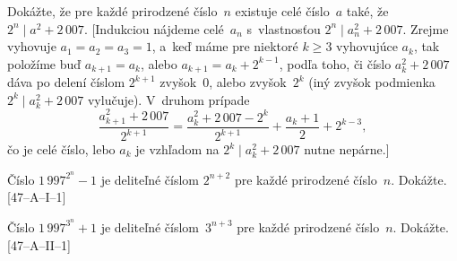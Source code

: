 {
Dokážte, že pre každé prirodzené číslo~$n$ existuje celé číslo~$a$
také, že $2^n\mid a^2+2\,007$. [Indukciou nájdeme celé~$a_n$
s~vlastnosťou $2^n\mid a_n^2+2\,007$.
Zrejme vyhovuje $a_1=a_2=a_3=1$,
a~keď máme pre niektoré $k\ge3$ vyhovujúce $a_k$,
tak položíme buď $a_{k+1}=a_{k}$, alebo $a_{k+1}=a_{k}+2^{k-1}$,
podľa toho, či číslo
$a_k^2+2\,007$ dáva po delení číslom $2^{k+1}$ zvyšok~$0$, alebo
zvyšok~$2^k$ (iný zvyšok podmienka $2^k\mid a_k^2+2\,007$
vylučuje). V~druhom prípade
$$
\frac{a_{k+1}^2+2\,007}{2^{k+1}}=
\frac{a_{k}^2+2\,007-2^k}{2^{k+1}}+
\frac{a_k+1}{2}+2^{k-3},
$$
čo je celé číslo, lebo $a_k$ je vzhľadom na
$2^k\mid a_k^2+2\,007$ nutne nepárne.]

\D%
Číslo $1\,997^{2^{n}}-1$ je deliteľné číslom $2^{n+2}$ pre
každé prirodzené číslo~$n$. Dokážte. [47--A--I--1]

Číslo $1\,997^{3^n}+1$ je deliteľné číslom~$3^{n+3}$ pre každé
prirodzené číslo~$n$. Dokážte. [47--A--II--1]
}


